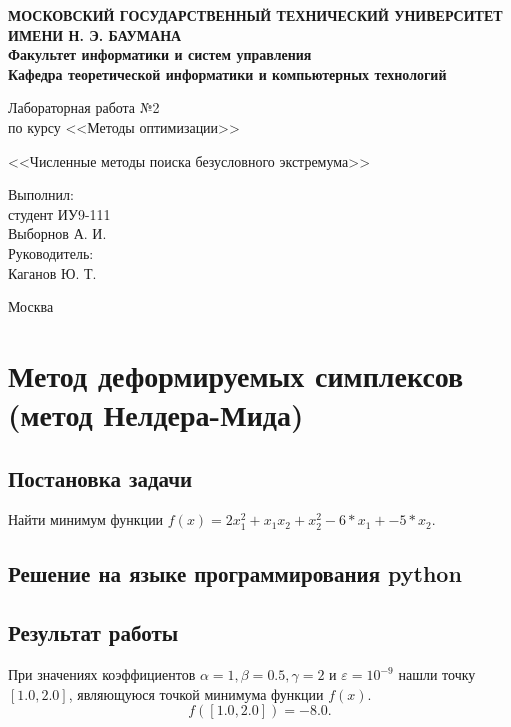 \documentclass[12pt,a4paper,oneside]{extarticle}
\begin{document}
\pgfplotsset{compat=1.8}

\thispagestyle{empty}
\newpage
{
\centering


\textbf{
МОСКОВСКИЙ ГОСУДАРСТВЕННЫЙ ТЕХНИЧЕСКИЙ УНИВЕРСИТЕТ ИМЕНИ Н. Э. БАУМАНА \\
Факультет информатики и систем управления \\
Кафедра теоретической информатики и компьютерных технологий}
\bigskip
\bigskip
\bigskip
\bigskip
\bigskip
\bigskip
\bigskip

\vfill


Лабораторная работа №2 \\
по курсу <<Методы оптимизации>>

\bigskip

{\large <<Численные методы поиска безусловного экстремума>>}
\bigskip

\vfill



\hfill\parbox{4cm} {
Выполнил:\\
студент ИУ9-111 \hfill \\
Выборнов А. И.\hfill \medskip\\
Руководитель:\\
Каганов Ю. Т.\hfill
}


\vspace{\fill}

Москва \number\year
\clearpage
}



\clearpage

\section{Метод деформируемых симплексов (метод Нелдера-Мида)}
    \subsection{Постановка задачи}
        Найти минимум функции $f(x) = 2x_1^2 + x_1x_2 + x_2^2 - 6*x_1 + -5*x_2$. 

    \subsection{Решение на языке программирования python}
        

    \subsection{Результат работы}
        При значениях коэффициентов $\alpha = 1, \beta=0.5, \gamma=2$ и $\varepsilon=10^{-9}$
    нашли точку $[1.0, 2.0]$, являющуюся точкой минимума функции $f(x)$. 
    $$f([1.0, 2.0]) = -8.0.$$
\end{document}
